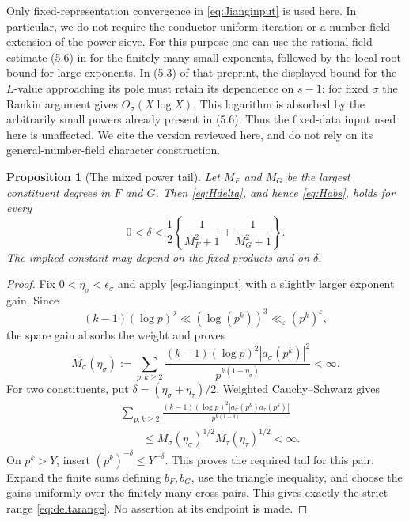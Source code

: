 \documentclass[11pt]{article}
\numberwithin{equation}{section}
\newtheorem{proposition}[theorem]{Proposition}
\theoremstyle{remark}
\begin{document}
Only fixed-representation convergence in \eqref{eq:Jianginput} is used
here. In particular, we do not require the conductor-uniform iteration
or a number-field extension of the power sieve. For this purpose one
can use the rational-field estimate (5.6) in \cite{Jiang} for the
finitely many small exponents, followed by the local root bound for
large exponents. In (5.3) of that preprint, the displayed bound for the
$L$-value approaching its pole must retain its dependence on
$s-1$: for fixed $\sigma$ the Rankin argument gives
$O_\sigma(X\log X)$. This logarithm is absorbed by the arbitrarily
small powers already present in (5.6). Thus the fixed-data input used
here is unaffected. We cite the version reviewed here, and do not rely
on its general-number-field character construction.

\begin{proposition}[The mixed power tail]\label{prop:sufficient}
Let $M_F$ and $M_G$ be the largest constituent degrees in $F$ and $G$.
Then \eqref{eq:Hdelta}, and hence \eqref{eq:Habs}, holds for every
\begin{equation}\label{eq:deltarange}
 0<\delta<\frac12\left\{\frac1{M_F^2+1}+\frac1{M_G^2+1}\right\}.
\end{equation}
The implied constant may depend on the fixed products and on $\delta$.
\end{proposition}

\begin{proof}
Fix $0<\eta_\sigma<\epsilon_\sigma$ and apply
\eqref{eq:Jianginput} with a slightly larger exponent gain.
Since
\[
 (k-1)(\log p)^2\ll (\log(p^k))^3\ll_\varepsilon(p^k)^\varepsilon,
\]
the spare gain absorbs the weight and proves
\begin{equation}\label{eq:weightedJiang}
 M_\sigma(\eta_\sigma):=
 \sum_{p,k\ge2}\frac{(k-1)(\log p)^2|a_\sigma(p^k)|^2}
                         {p^{k(1-\eta_\sigma)}}<\infty.
\end{equation}
For two constituents, put $\delta=(\eta_\sigma+\eta_\tau)/2$.
Weighted Cauchy--Schwarz gives
\begin{align*}
 &\sum_{p,k\ge2}
 \frac{(k-1)(\log p)^2|a_\sigma(p^k)a_\tau(p^k)|}
                         {p^{k(1-\delta)}}\\
 &\qquad\le M_\sigma(\eta_\sigma)^{1/2}
               M_\tau(\eta_\tau)^{1/2}<\infty.
\end{align*}
On $p^k>Y$, insert $(p^k)^{-\delta}\le Y^{-\delta}$.
This proves the required tail for this pair. Expand the finite sums
defining $b_F,b_G$, use the triangle inequality, and choose the gains
uniformly over the finitely many cross pairs. This gives exactly the
strict range \eqref{eq:deltarange}. No assertion at its endpoint is made.
\end{proof}
\end{document}
